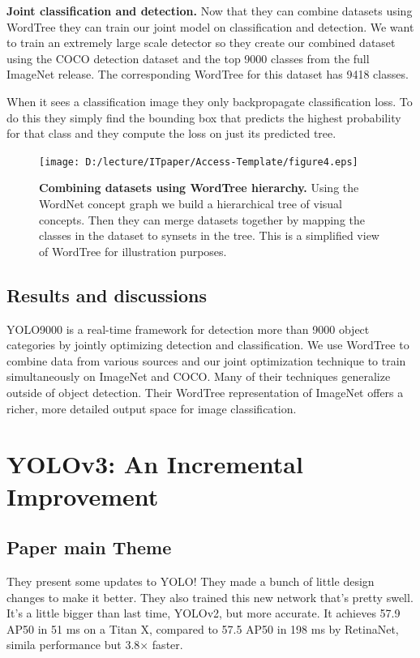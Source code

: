 \documentclass{ieeeaccess}
\begin{document}
\textbf{Joint classification and detection.} Now that they can combine datasets using WordTree they can train our joint model on classification and detection. We want to train an extremely large scale detector so they create our combined dataset using the COCO detection dataset and the top 9000 classes from the full ImageNet release. The corresponding WordTree for this dataset has 9418 classes.

When it sees a classification image they only backpropagate classification loss. To do this they simply find the bounding box that predicts the highest probability for that class and they compute the loss on just its predicted tree.

\begin{figure}
	\centering
		\texttt{[image: D:/lecture/ITpaper/Access-Template/figure4.eps]}
	\caption {\textbf{Combining datasets using WordTree hierarchy.} Using the WordNet concept graph we build a hierarchical tree of visual concepts. Then they can merge datasets together by mapping the classes in the dataset to synsets in the tree. This is a simplified view of WordTree for illustration purposes.}
	\label{fig:figure4}
\end{figure}

\subsection{Results and discussions}
YOLO9000 is a real-time framework for detection more than 9000 object categories by jointly optimizing detection and classification. We use WordTree to combine data from various sources and our joint optimization technique to train simultaneously on ImageNet and COCO. Many of their techniques generalize outside of object detection. Their WordTree representation of ImageNet offers a richer, more detailed output space for image classification.

\section{YOLOv3: An Incremental Improvement}
\subsection{Paper main Theme}
They present some updates to YOLO! They made a bunch of little design changes to make it better. They also trained this new network that’s pretty swell. It’s a little bigger than last time, YOLOv2, but more accurate. It achieves 57.9 AP50 in 51 ms on a Titan X, compared to 57.5 AP50 in 198 ms by RetinaNet, simila performance but 3.8× faster.
\end{document}
